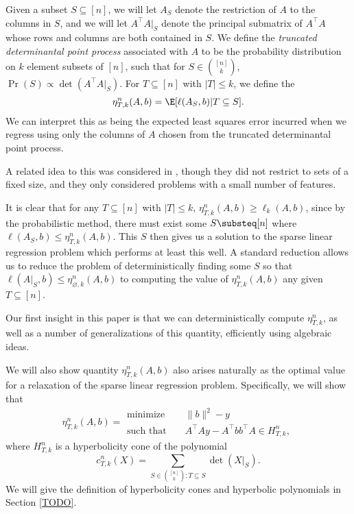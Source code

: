 Given a subset $S \subseteq [n]$, we will let $A_S$ denote the restriction of $A$ to the columns in $S$, and we will let $A^{\intercal}A|_S$ denote the principal submatrix of $A^{\intercal}A$ whose rows and columns are both contained in $S$.
We define the \emph{truncated determinantal point process} \cite{TODO} associated with $A$ to be the probability distribution on $k$ element subsets of $[n]$, such that for $S \in \binom{[n]}{k}$, $\Pr(S) \propto \det(A^{\intercal}A|_S)$.
For $T \subseteq [n]$ with $|T| \le k$, we define the 
\[
    \eta_{T, k}^n(A,b) = \E[\ell(A_S, b) | T \subseteq S].
\]
We can interpret this as being the expected least squares error incurred when we regress using only the columns of $A$ chosen from the truncated determinantal point process.

A related idea to this was considered in \cite{TODO}, though they did not restrict to sets of a fixed size, and they only considered problems with a small number of features.

It is clear that for any $T \subseteq [n]$ with $|T| \le k$, $\eta_{T, k}^n(A,b) \ge \ell_k(A,b)$, since by the probabilistic method, there must exist some $S \substeq [n]$ where $\ell(A_S, b) \le \eta_{T, k}^n(A,b)$.
This $S$ then gives us a solution to the sparse linear regression problem which performs at least this well.
A standard reduction allows us to reduce the problem of deterministically finding some $S$ so that $\ell(A|_S, b) \le \eta_{\varnothing, k}^n(A, b)$ to computing the value of $ \eta_{T, k}^n(A, b)$ any given $T \subseteq [n]$.

Our first insight in this paper is that we can deterministically compute $\eta_{T,k}^n$, as well as a number of generalizations of this quantity, efficiently using algebraic ideas.

We will also show quantity $\eta_{T, k}^n(A, b)$ also arises naturally as the optimal value for a relaxation of the sparse linear regression problem.
Specifically, we will show that 
\begin{equation*}
    \eta_{T, k}^n(A,b) =
\begin{aligned}
    \text{minimize} &&\|b\|^2 - y\\
    \text{such that } &&A^{\intercal}Ay - A^{\intercal}bb^{\intercal}A \in H_{T, k}^n,
\end{aligned}
\end{equation*}
where $H_{T, k}^n$ is a hyperbolicity cone of the polynomial 
\[
    c_{T, k}^n(X) = \sum_{S \in \binom{[n]}{k} : T \subseteq S} \det(X|_S).
\]
We will give the definition of hyperbolicity cones and hyperbolic polynomials in Section \ref{TODO}.

